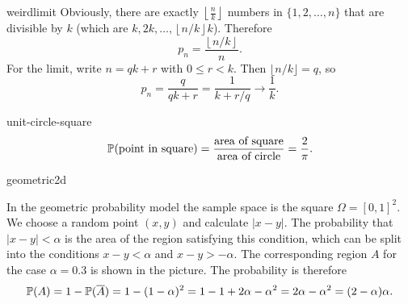 \begin{sol}{weirdlimit}
    Obviously, there are exactly $\left\lfloor\frac{n}{k}\right\rfloor$ numbers in $\{1,2,\ldots,n\}$ that are divisible by $k$ (which are $k, 2k, \ldots, \left\lfloor n/k\right\rfloor k$). Therefore
    \[
        p_n=\frac{\left\lfloor n/k\right\rfloor}{n}.
    \]
    For the limit, write $n=qk+r$ with $0\le r<k$. Then $\lfloor n/k\rfloor=q$, so
    \[
        p_n=\frac{q}{qk+r}=\frac{1}{k+r/q}\longrightarrow\frac{1}{k}.
    \]
\end{sol}

\begin{sol}{unit-circle-square}
    \[
    \mathbb{P}(\text{point in square})=\frac{\text{area of square}}{\text{area of circle}}=\frac2\pi.
    \]
\end{sol}

\begin{sol}{geometric2d}
    \begin{figure}
    \centering
    \end{figure}
    In the geometric probability model the sample space is the square $\Omega=[0,1]^2$. We choose a random point $(x,y)$ and calculate $|x-y|$. The probability that $|x-y|<\alpha$ is the area of the region satisfying this condition, which can be split into the conditions $x-y<\alpha$ and $x-y>-\alpha$. The corresponding region $A$ for the case $\alpha=0.3$ is shown in the picture. The probability is therefore
    \[
        \mathbb{P}(A)=1-\mathbb{P}(\overline{A})=1-(1-\alpha)^2=1-1+2\alpha-\alpha^2=2\alpha-\alpha^2=(2-\alpha)\alpha.
    \]
\end{sol}

